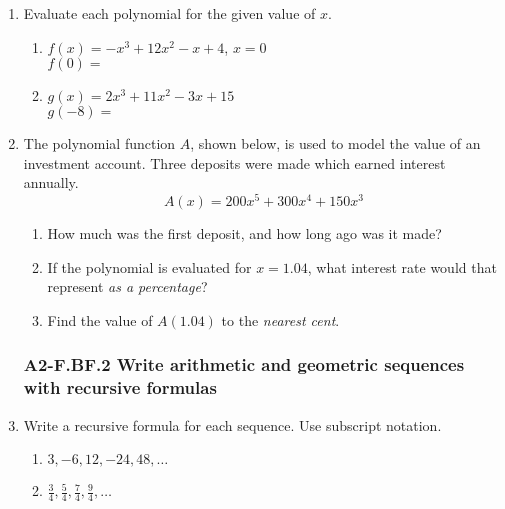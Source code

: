 \documentclass[12pt, twoside]{article}
\begin{document}
\begin{enumerate}
\newpage
    \item Evaluate each polynomial for the given value of $x$.
    \begin{multicols}{2}
        \begin{enumerate}[itemsep=1cm]
            \item $f(x)=-x^3+12x^2-x+4$, $x=0$ \\[0.25cm] 
            $f(0) = $ \vspace{2cm}
            \item $g(x)=2x^3+11x^2-3x+15$ \\[0.25cm] 
            $g(-8) = $ \vspace{2cm}
        \end{enumerate}
        \end{multicols}
    
    \item The polynomial function $A$, shown below, is used to model the value of an investment account. Three deposits were made which earned interest annually.  $$A(x)=200x^5+300x^4+150x^3$$ 
    \begin{enumerate}[itemsep=1cm]
        \item How much was the first deposit, and how long ago was it made? \vspace{1cm}
        \item If the polynomial is evaluated for $x = 1.04$, what interest rate would that represent \emph{as a percentage}?
        \item Find the value of $A(1.04)$ to the \emph{nearest cent}. \vspace{2cm}
    \end{enumerate}

\subsubsection*{A2-F.BF.2 Write arithmetic and geometric sequences with recursive formulas}
\item Write a recursive formula for each sequence. Use subscript notation.
    \begin{multicols}{2}
    \begin{enumerate}
        \item $3, -6, 12, -24, 48, \dots$
        \item $\displaystyle \frac{3}{4}, \frac{5}{4}, \frac{7}{4}, \frac{9}{4},  \dots$ 
    \end{enumerate}
    \end{multicols}


\end{enumerate}
\end{document}
